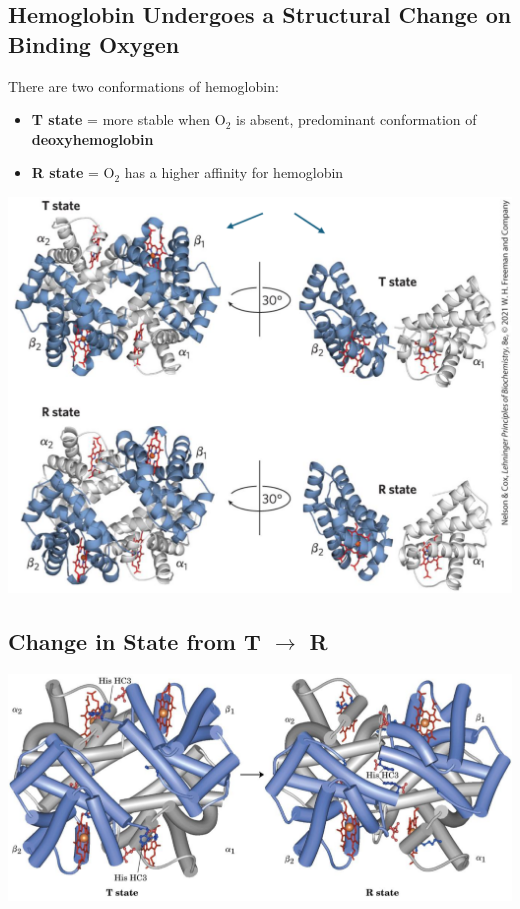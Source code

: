 \documentclass[10pt]{article}
\begin{document}
\subsection*{Hemoglobin Undergoes a Structural Change on Binding Oxygen}
There are two conformations of hemoglobin:
\begin{itemize}
    \item \textbf{T state} = more stable when O$_2$ is absent, predominant conformation of \textbf{deoxyhemoglobin}
    \item \textbf{R state} = O$_2$ has a higher affinity for hemoglobin
\end{itemize}
\begin{center}
    \includegraphics*[scale=0.5]{L3_5.png}
\end{center}

\subsection*{Change in State from T $\rightarrow$ R}
\begin{center}
    \includegraphics*[width=\textwidth]{L3_6.png}
\end{center}
\end{document}
